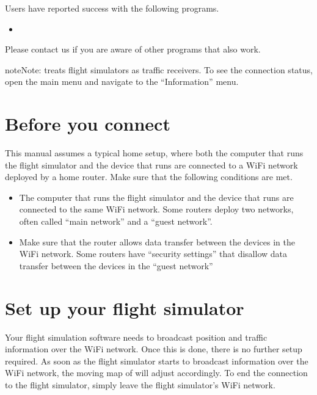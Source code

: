 \documentclass[letterpaper,10pt,english]{sphinxmanual}
\begin{document}
\sphinxAtStartPar
Users have reported success with the following programs.
\begin{itemize}
\item {} 
\sphinxAtStartPar
{}%
\begin{footnote}[14]\sphinxAtStartFootnote
{}
%
\end{footnote}

\end{itemize}

\sphinxAtStartPar
Please contact us if you are aware of other programs that also work.

\begin{sphinxadmonition}{note}{Note:}
\sphinxAtStartPar
{} treats flight simulators as traffic
receivers.  To see the connection status, open the main menu and navigate to
the “Information” menu.
\end{sphinxadmonition}


\section{Before you connect}
\label{\detokenize{02-steps/simulator:before-you-connect}}
\sphinxAtStartPar
This manual assumes a typical home setup, where both the computer that runs the
flight simulator and the device that runs  are
connected to a Wi\sphinxhyphen{}Fi network deployed by a home router.  Make sure that the
following conditions are met.
\begin{itemize}
\item {} 
\sphinxAtStartPar
The computer that runs the flight simulator and the device that runs  are connected to the same Wi\sphinxhyphen{}Fi network.  Some routers
deploy two networks, often called “main network” and a “guest network”.

\item {} 
\sphinxAtStartPar
Make sure that the router allows data transfer between the devices in the
Wi\sphinxhyphen{}Fi network.  Some routers have “security settings” that disallow data
transfer between the devices in the “guest network”

\end{itemize}


\section{Set up your flight simulator}
\label{\detokenize{02-steps/simulator:set-up-your-flight-simulator}}
\sphinxAtStartPar
Your flight simulation software needs to broadcast position and traffic
information over the Wi\sphinxhyphen{}Fi network.  Once this is done, there is no further
setup required.  As soon as the flight simulator starts to broadcast information
over the Wi\sphinxhyphen{}Fi network, the moving map of  will
adjust accordingly.  To end the connection to the flight simulator, simply leave
the flight simulator’s Wi\sphinxhyphen{}Fi network.
\end{document}
